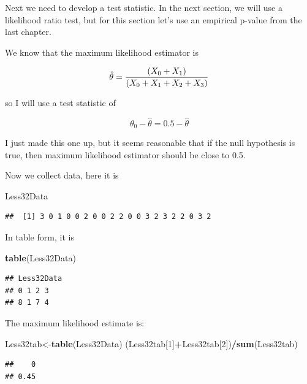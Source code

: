 \documentclass[]{book}
\newenvironment{Shaded}{\begin{snugshade}}{\end{snugshade}}
\newcommand{\KeywordTok}[1]{\textcolor[rgb]{0.13,0.29,0.53}{\textbf{#1}}}
\newcommand{\DecValTok}[1]{\textcolor[rgb]{0.00,0.00,0.81}{#1}}
\newcommand{\OperatorTok}[1]{\textcolor[rgb]{0.81,0.36,0.00}{\textbf{#1}}}
\newcommand{\NormalTok}[1]{#1}
\theoremstyle{definition}
\theoremstyle{definition}
\theoremstyle{definition}
\theoremstyle{remark}
\begin{document}
Next we need to develop a test statistic. In the next section, we will
use a likelihood ratio test, but for this section let's use an empirical
p-value from the last chapter.

We know that the maximum likelihood estimator is

\[\hat{\theta}={ (X_{0}+X_{1}) \over (X_{0}+X_{1}+X_{2}+X_{3}) }\]

so I will use a test statistic of

\[\theta_{0}-\hat{\theta}=0.5-\hat{\theta}\]

I just made this one up, but it seems reasonable that if the null
hypothesis is true, then maximum likelihood estimator should be close to
0.5.

Now we collect data, here it is

\begin{Shaded}
\begin{Highlighting}[]
\NormalTok{Less32Data}
\end{Highlighting}
\end{Shaded}

\begin{verbatim}
##  [1] 3 0 1 0 0 2 0 0 2 2 0 0 3 2 3 2 2 0 3 2
\end{verbatim}

In table form, it is

\begin{Shaded}
\begin{Highlighting}[]
\KeywordTok{table}\NormalTok{(Less32Data)}
\end{Highlighting}
\end{Shaded}

\begin{verbatim}
## Less32Data
## 0 1 2 3 
## 8 1 7 4
\end{verbatim}

The maximum likelihood estimate is:

\begin{Shaded}
\begin{Highlighting}[]
\NormalTok{Less32tab<-}\KeywordTok{table}\NormalTok{(Less32Data)}
\NormalTok{(Less32tab[}\DecValTok{1}\NormalTok{]}\OperatorTok{+}\NormalTok{Less32tab[}\DecValTok{2}\NormalTok{])}\OperatorTok{/}\KeywordTok{sum}\NormalTok{(Less32tab)}
\end{Highlighting}
\end{Shaded}

\begin{verbatim}
##    0 
## 0.45
\end{verbatim}
\end{document}
